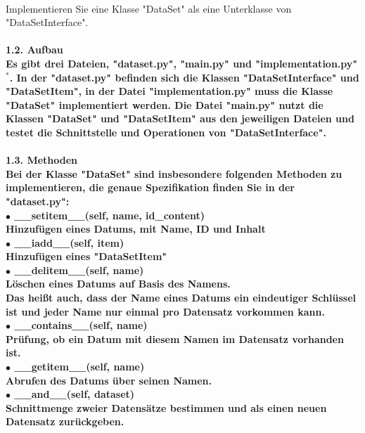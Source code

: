 \documentclass[]{scrartcl}
\begin{document}
\\
Implementieren Sie eine Klasse "DataSet" als eine Unterklasse von "DataSetInterface".\\
\\
\bf 1.2. Aufbau \normalfont\\[0.5cm]
Es gibt drei Dateien, "dataset.py", "main.py" und "implementation.py"$^*$.
In der "dataset.py" befinden sich die Klassen "DataSetInterface" und "DataSetItem",
in der Datei "implementation.py" muss die Klasse "DataSet" implementiert werden.
Die Datei "main.py" nutzt die Klassen "DataSet" und "DataSetItem" aus den jeweiligen Dateien und testet die Schnittstelle und Operationen von "DataSetInterface".\\
\\
\bf 1.3. Methoden \normalfont\\[0.5cm]
Bei der Klasse "DataSet" sind insbesondere folgenden Methoden zu implementieren, die genaue Spezifikation finden Sie in der "dataset.py":\\
$\bullet$ \_\_setitem\_\_(self, name, id\_content)\\
\hspace*{1cm} Hinzufügen eines Datums, mit Name, ID und Inhalt\\
$\bullet$ \_\_iadd\_\_(self, item)\\
\hspace*{1cm} Hinzufügen eines "DataSetItem"\\
$\bullet$ \_\_delitem\_\_(self, name)\\
\hspace*{1cm} Löschen eines Datums auf Basis des Namens.\\
\hspace*{1cm} Das heißt auch, dass der Name eines Datums ein eindeutiger Schlüssel ist und jeder Name nur einmal pro Datensatz vorkommen kann.\\
$\bullet$ \_\_contains\_\_(self, name)\\
\hspace*{1cm} Prüfung, ob ein Datum mit diesem Namen im Datensatz vorhanden ist.\\
$\bullet$ \_\_getitem\_\_(self, name)\\
\hspace*{1cm} Abrufen des Datums über seinen Namen.\\ 
$\bullet$ \_\_and\_\_(self, dataset)\\
\hspace*{1cm} Schnittmenge zweier Datensätze bestimmen und als einen neuen Datensatz zurückgeben.\\
\end{document}
